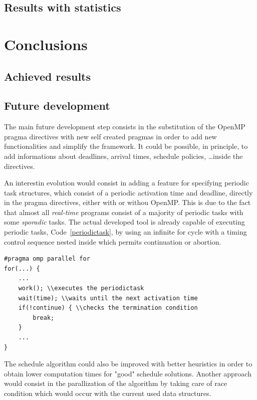 \documentclass[a4paper,11pt,oneside]{book}
\begin{document}
\section{Results with statistics}

\chapter{Conclusions}
\section{Achieved results}
\section{Future development}

The main future development step consists in the substitution of the OpenMP pragma directives with new self created pragmas in order to add new functionalities and simplify the framework. It could be possible, in principle, to add informations about deadlines, arrival times, schedule policies, \dots inside the directives. 

An interestin evolution would consist in adding a feature for specifying periodic task structures, which consist of a periodic activation time and deadline, directly in the pragma directives, either with or withou OpenMP. This is due to the fact that almost all \emph{real-time} programs consist of a majority of periodic tasks with some \emph{sporadic} tasks. The actual developed tool is already capable of executing periodic tasks, Code~\ref{periodictask}, by using an infinite for cycle with a timing control sequence nested inside which permits continuation or abortion.

\begin{lstlisting}[language=CCC, caption=Example of a periodic task., label=periodictask]
#pragma omp parallel for
for(...) {
	...
	work(); \\executes the periodictask
	wait(time); \\waits until the next activation time
	if(!continue) { \\checks the termination condition
		break;
	}
	...
}

\end{lstlisting}

The schedule algorithm could also be improved with better heuristics in order to obtain lower computation times for "good" schedule solutions. Another approach would consist in the parallization of the algorithm by taking care of race condition which would occur with the current used data structures.
\end{document}
